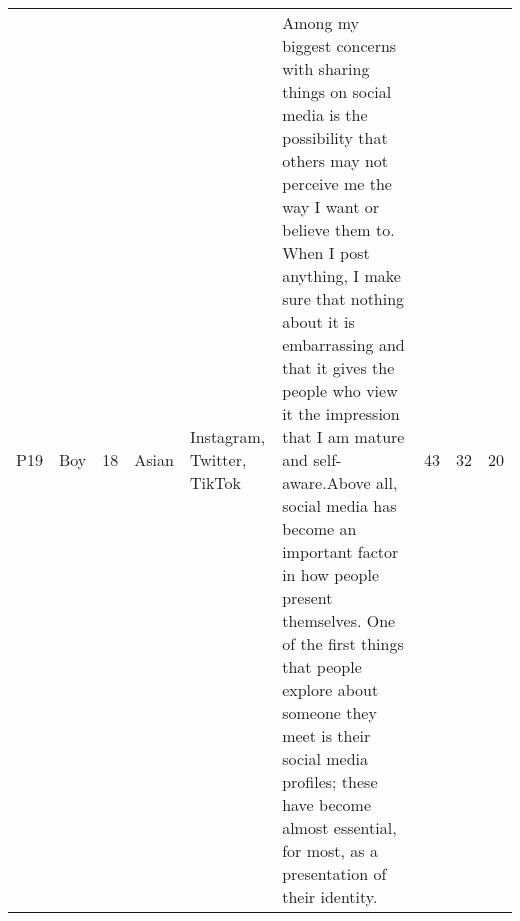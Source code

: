 \begin{longtable}{l p{1cm} p{0.5cm} p{0.8cm} p{2.5cm} p{7.3cm} r r r}
 P19 & Boy & 18 & Asian & Instagram, Twitter, TikTok & Among my biggest concerns with sharing things on social media is the possibility that others may not perceive me the way I want or believe them to. When I post anything, I make sure that nothing about it is embarrassing and that it gives the people who view it the impression that I am mature and self-aware.\newline{}\newline{}Above all, social media has become an important factor in how people present themselves. One of the first things that people explore about someone they meet is their social media profiles; these have become almost essential, for most, as a presentation of their identity. & 43 & 32 & 20 \\
\end{longtable}
\vspace{-5mm}
